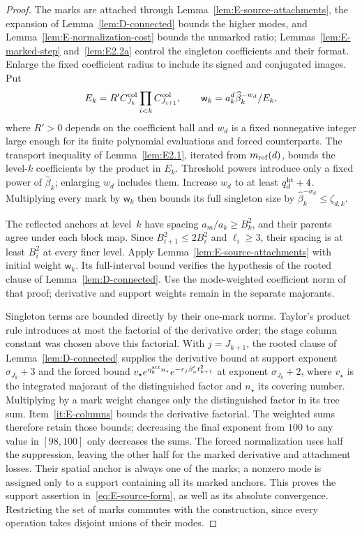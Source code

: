 \begin{proof}
The marks are attached through Lemma~\ref{lem:E-source-attachments}, the expansion of Lemma~\ref{lem:D-connected} bounds the higher modes, and Lemma~\ref{lem:E-normalization-cost} bounds the unmarked ratio; Lemmas~\ref{lem:E-marked-step} and~\ref{lem:E2.2a} control the singleton coefficients and their format. Enlarge the fixed coefficient radius to include its signed and conjugated images. Put
\begin{equation*}
 E_k=R' C^{\rm col}_{J_k}\prod_{i<k}C^{\rm col}_{J_{i+1}},\qquad
 \mathsf w_k=a_k^d\widehat\beta_k^{-w_d}/E_k,
\end{equation*}
where $R'>0$ depends on the coefficient ball and $w_d$ is a fixed nonnegative integer large enough for its finite polynomial evaluations and forced counterparts. The transport inequality of Lemma~\ref{lem:E2.1}, iterated from $m_{\mathrm{ref}}(d)$, bounds the level-$k$ coefficients by the product in $E_k$. Threshold powers introduce only a fixed power of $\widehat\beta_k$; enlarging $w_d$ includes them. Increase $w_d$ to at least $q^{\rm ht}_d+4$. Multiplying every mark by $\mathsf w_k$ then bounds its full singleton size by $\widehat\beta_k^{-w_d}\le\zeta_{d,k}$.

The reflected anchors at level~$k$ have spacing $a_m/a_k\ge B_k^2$, and their parents agree under each block map. Since $B_{i+1}^2\le2B_i^2$ and $\ell_i\ge3$, their spacing is at least $B_i^2$ at every finer level. Apply Lemma~\ref{lem:E-source-attachments} with initial weight $\mathsf w_k$. Its full-interval bound verifies the hypothesis of the rooted clause of Lemma~\ref{lem:D-connected}. Use the mode-weighted coefficient norm of that proof; derivative and support weights remain in the separate majorants.

Singleton terms are bounded directly by their one-mark norms. Taylor's product rule introduces at most the factorial of the derivative order; the stage column constant was chosen above this factorial. With $j=J_{k+1}$, the rooted clause of Lemma~\ref{lem:D-connected} supplies the derivative bound at support exponent $\sigma_{J_k}+3$ and the forced bound $v_\star e^{\eta^{\rm att}_kn_\star}e^{-r_j\beta'_u t_{k+1}^2}$ at exponent $\sigma_{J_k}+2$, where $v_\star$ is the integrated majorant of the distinguished factor and $n_\star$ its covering number. Multiplying by a mark weight changes only the distinguished factor in its tree sum. Item~\ref{it:E-columns} bounds the derivative factorial. The weighted sums therefore retain those bounds; decreasing the final exponent from $100$ to any value in $[98,100]$ only decreases the sums. The forced normalization uses half the suppression, leaving the other half for the marked derivative and attachment losses. Their spatial anchor is always one of the marks; a nonzero mode is assigned only to a support containing all its marked anchors. This proves the support assertion in~\eqref{eq:E-source-form}, as well as its absolute convergence. Restricting the set of marks commutes with the construction, since every operation takes disjoint unions of their modes.


\end{proof}
